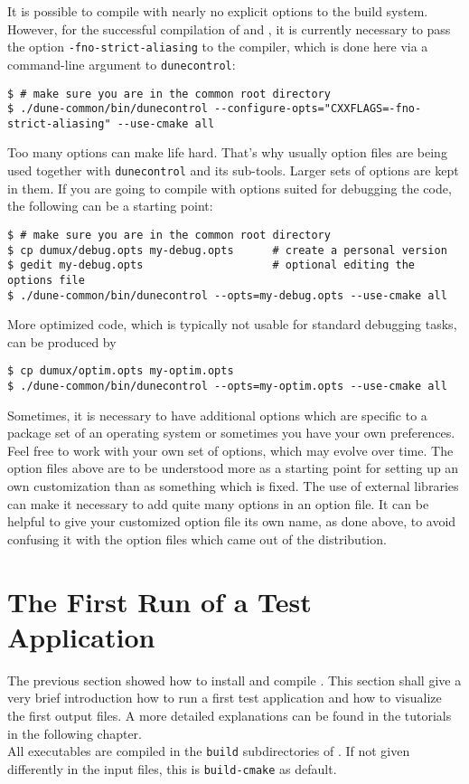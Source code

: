 It is possible to compile \Dumux with nearly no explicit options to the build system.
However, for the successful compilation of \Dune and \Dumux, it is currently necessary to pass
the option \texttt{-fno-strict-aliasing} to the \Cplusplus compiler,
which is done here via a command-line argument to \texttt{dunecontrol}:
\begin{lstlisting}[style=Bash]
$ # make sure you are in the common root directory
$ ./dune-common/bin/dunecontrol --configure-opts="CXXFLAGS=-fno-strict-aliasing" --use-cmake all
\end{lstlisting}

Too many options can make life hard. That's why usually option files are being used together with \texttt{dunecontrol} and its sub-tools.
Larger sets of options are kept in them. If you are going to compile with options suited for debugging the code, the following
can be a starting point:
\begin{lstlisting}[style=Bash]
$ # make sure you are in the common root directory
$ cp dumux/debug.opts my-debug.opts      # create a personal version
$ gedit my-debug.opts                    # optional editing the options file
$ ./dune-common/bin/dunecontrol --opts=my-debug.opts --use-cmake all
\end{lstlisting}

More optimized code, which is typically not usable for standard debugging tasks, can be produced by
\begin{lstlisting}[style=Bash]
$ cp dumux/optim.opts my-optim.opts
$ ./dune-common/bin/dunecontrol --opts=my-optim.opts --use-cmake all
\end{lstlisting}

Sometimes, it is necessary to have additional options which
are specific to a package set of an operating system or
sometimes you have your own preferences.
Feel free to work with your own set of options, which may evolve over time.
The option files above are to be understood more as a starting point
for setting up an own customization than as something which is fixed.
The use of external libraries can make it necessary to add quite many options in an option file.
It can be helpful to give your customized option file its own name, as done above,
to avoid confusing it with the option files which came out of the distribution.

\section{The First Run of a Test Application}
\label{quick-start-guide}
The previous section showed how to install and compile \Dumux. This section
shall give a very brief introduction how to run a first test application and how
to visualize the first output files. A more detailed explanations can be found in
the tutorials in the following chapter.\\
All executables are compiled in the \texttt{build} subdirectories of \Dumux.
If not given differently in the input files, this is \texttt{build-cmake} as default.

